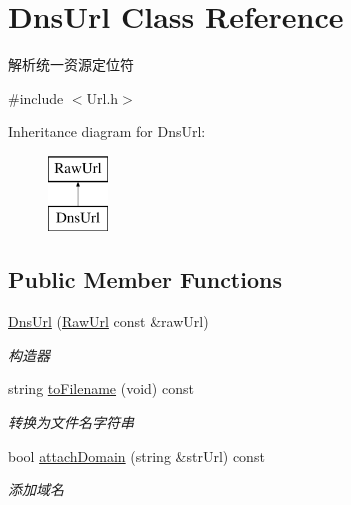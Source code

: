 \hypertarget{class_dns_url}{}\section{Dns\+Url Class Reference}
\label{class_dns_url}


解析统一资源定位符  




{\ttfamily \#include $<$Url.\+h$>$}

Inheritance diagram for Dns\+Url\+:\begin{figure}[H]
\begin{center}
\leavevmode
\includegraphics[height=2.000000cm]{class_dns_url}
\end{center}
\end{figure}
\subsection*{Public Member Functions}
\begin{DoxyCompactItemize}
\item 
\hyperlink{class_dns_url_a755c96cfb2eb70b9a39585553424f435}{Dns\+Url} (\hyperlink{class_raw_url}{Raw\+Url} const \&raw\+Url)
\begin{DoxyCompactList}\small\item\em 构造器 \end{DoxyCompactList}\item 
string \hyperlink{class_dns_url_a74cec9202ecf7631d02f53dcc498a4c6}{to\+Filename} (void) const
\begin{DoxyCompactList}\small\item\em 转换为文件名字符串 \end{DoxyCompactList}\item 
bool \hyperlink{class_dns_url_a96e4aa0b84d4bf4a693eed04ea7de4ca}{attach\+Domain} (string \&str\+Url) const
\begin{DoxyCompactList}\small\item\em 添加域名 \end{DoxyCompactList}\end{DoxyCompactItemize}

